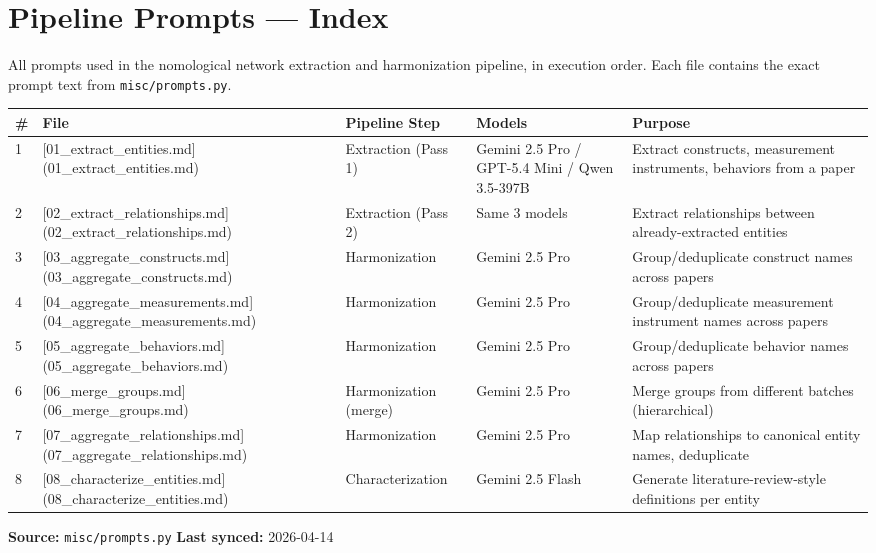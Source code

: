 \section*{Pipeline Prompts --- Index}

All prompts used in the nomological network extraction and harmonization pipeline, in execution order. Each file contains the exact prompt text from \texttt{misc/prompts.py}.

\begin{tabular}{|l|l|l|l|l|}
\hline
\# & File & Pipeline Step & Models & Purpose \\
\hline
1 & [01\_extract\_entities.md](01\_extract\_entities.md) & Extraction (Pass 1) & Gemini 2.5 Pro / GPT-5.4 Mini / Qwen 3.5-397B & Extract constructs, measurement instruments, behaviors from a paper \\
2 & [02\_extract\_relationships.md](02\_extract\_relationships.md) & Extraction (Pass 2) & Same 3 models & Extract relationships between already-extracted entities \\
3 & [03\_aggregate\_constructs.md](03\_aggregate\_constructs.md) & Harmonization & Gemini 2.5 Pro & Group/deduplicate construct names across papers \\
4 & [04\_aggregate\_measurements.md](04\_aggregate\_measurements.md) & Harmonization & Gemini 2.5 Pro & Group/deduplicate measurement instrument names across papers \\
5 & [05\_aggregate\_behaviors.md](05\_aggregate\_behaviors.md) & Harmonization & Gemini 2.5 Pro & Group/deduplicate behavior names across papers \\
6 & [06\_merge\_groups.md](06\_merge\_groups.md) & Harmonization (merge) & Gemini 2.5 Pro & Merge groups from different batches (hierarchical) \\
7 & [07\_aggregate\_relationships.md](07\_aggregate\_relationships.md) & Harmonization & Gemini 2.5 Pro & Map relationships to canonical entity names, deduplicate \\
8 & [08\_characterize\_entities.md](08\_characterize\_entities.md) & Characterization & Gemini 2.5 Flash & Generate literature-review-style definitions per entity \\
\hline
\end{tabular}

\textbf{Source:} \texttt{misc/prompts.py}  
\textbf{Last synced:} 2026-04-14
